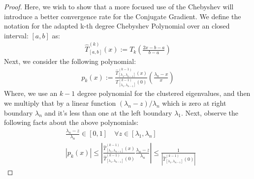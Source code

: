 \documentclass[]{article}
\theoremstyle{definition}
\begin{document}
            \begin{proof}
                Here, we wish to show that a more focused use of the Chebyshev will introduce a better convergence rate for the Conjugate Gradient. We define the notation for the adapted k-th degree Chebyshev Polynomial over an closed interval: $[a, b]$ as: 
                \begin{align}
                    \hat{T}_{[a, b]}^{(k)}(x) := 
                    T_k\left(
                        \frac{2x - b - a}{b - a}
                    \right)
                \end{align} 
                Next, we consider the following polynomial: 
                \begin{align}
                    p_k(x) := 
                    \frac
                    {
                        \hat{T}_{[\lambda_1, \lambda_{n - 1}]}^{(k - 1)}
                        \left(
                            x
                        \right)
                    }{
                        T^{(k - 1)}_{[\lambda_1, \lambda_{n - 1}]}
                        \left(
                            0
                        \right)
                    }
                    \left(
                        \frac{\lambda_n - x}{x}
                    \right)
                \end{align}
                Where, we use an $k-1$ degree polynomial for the clustered eigenvalues, and then we multiply that by a linear function $(\lambda_n - z)/\lambda_n$ which is zero at right boundary $\lambda_n$ and it's less than one at the left boundary $\lambda_1$. Next, observe the following facts about the above polynomials: 
                \begin{align}
                    &
                    \frac{\lambda_n - z}{\lambda_n} \in [0, 1]
                    \quad \forall z \in [\lambda_1, \lambda_n]
                    \\
                    & 
                    |p_k(x)| \le
                    \left|
                        \frac{
                            \hat{T}_{[\lambda_1, \lambda_{n-1}]}^{(k - 1)}(x)
                        }{
                            \hat{T}_{[\lambda_1, \lambda_{n - 1}]}^{(k - 1)}(0)
                        }
                        \frac{\lambda_n - z}{\lambda_n}
                    \right|
                    \le 
                    \frac{1}{
                    \left|
                        \hat{T}_{[\lambda_1, \lambda_{n - 1}]}^{(k - 1)}(0)
                    \right|}
                \end{align}

\end{proof}
\end{document}
